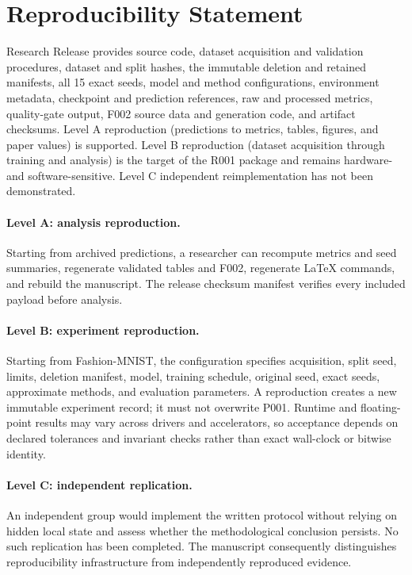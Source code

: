 \section{Reproducibility Statement}
Research Release \StudyRelease{} provides source code, dataset acquisition and validation
procedures, dataset and split hashes, the immutable deletion and retained manifests, all 15
exact seeds, model and method configurations, environment metadata, checkpoint and
prediction references, raw and processed metrics, quality-gate output, F002 source data and
generation code, and artifact checksums. Level A reproduction (predictions to metrics,
tables, figures, and paper values) is supported. Level B reproduction (dataset acquisition
through training and analysis) is the target of the R001 package and remains hardware- and
software-sensitive. Level C independent reimplementation has not been demonstrated.

\paragraph{Level A: analysis reproduction.}
Starting from archived predictions, a researcher can recompute metrics and seed summaries,
regenerate validated tables and F002, regenerate LaTeX commands, and rebuild the manuscript.
The release checksum manifest verifies every included payload before analysis.

\paragraph{Level B: experiment reproduction.}
Starting from Fashion-MNIST, the configuration specifies acquisition, split seed, limits,
deletion manifest, model, training schedule, original seed, exact seeds, approximate
methods, and evaluation parameters. A reproduction creates a new immutable experiment
record; it must not overwrite P001. Runtime and floating-point results may vary across
drivers and accelerators, so acceptance depends on declared tolerances and invariant
checks rather than exact wall-clock or bitwise identity.

\paragraph{Level C: independent replication.}
An independent group would implement the written protocol without relying on hidden local
state and assess whether the methodological conclusion persists. No such replication has
been completed. The manuscript consequently distinguishes reproducibility infrastructure
from independently reproduced evidence.
